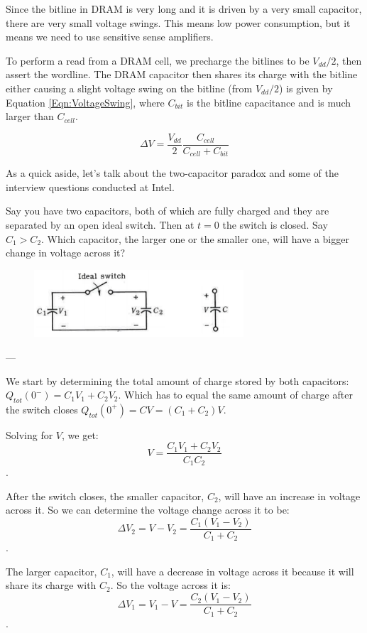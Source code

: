\documentclass{article}
\newcommand{\myequations}[1]{
   \addcontentsline{equ}{myequations}{\protect\numberline{\theequation}#1}
}
\begin{document}
Since the bitline in DRAM is very long and it is driven by a very small capacitor, there are very small voltage swings. This means low power consumption, but it means we need to use sensitive sense amplifiers. 

To perform a read from a DRAM cell, we precharge the bitlines to be $V_{dd}/2$, then assert the wordline. The DRAM capacitor then shares its charge with the bitline either causing a slight voltage swing on the bitline (from $V_{dd}/2$) is given by Equation \ref{Eqn:VoltageSwing}, where $C_{bit}$ is the bitline capacitance and is much larger than $C_{cell}$. 

\begin{equation}
\Delta V = \frac{V_{dd}}{2} \frac{C_{cell}}{C_{cell} + C_{bit}}
\label{Eqn:VoltageSwing}
\end{equation}
\myequations{Bitline Voltage Swing}

As a quick aside, let's talk about the two-capacitor paradox and some of the interview questions conducted at Intel. 

Say you have two capacitors, both of which are fully charged and they are separated by an open ideal switch. Then at $t=0$ the switch is closed. Say $C_1 > C_2$. Which capacitor, the larger one or the smaller one, will have a bigger change in voltage across it?


\begin{figure}[ht!]
\centering
\includegraphics[height=25mm]{Paradox.png}
\end{figure}


---

We start by determining the total amount of charge stored by both capacitors: $Q_{tot}(0^-) = C_1 V_1 + C_2 V_2$. Which has to equal the same amount of charge after the switch closes $Q_{tot}(0^+) = CV = (C_1 + C_2)V$. 

Solving for $V$, we get: $$V = \frac{C_1 V_1 + C_2 V_2}{C_1 C_2}$$. 

After the switch closes, the smaller capacitor, $C_2$, will have an increase in voltage across it. So we can determine the voltage change across it to be: $$\Delta V_2 = V - V_2 = \frac{C_1(V
_1 - V_2)}{C_1 + C_2}$$.

The larger capacitor, $C_1$, will have a decrease in voltage across it because it will share its charge with $C_2$. So the voltage across it is: $$\Delta V_1 = V_1 - V = \frac{C_2(V_1 - V_2)}{C_1 + C_2}$$.
\end{document}
